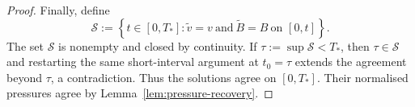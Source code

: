 \documentclass[11pt,reqno]{amsart}
\theoremstyle{plain}
\theoremstyle{definition}
\theoremstyle{remark}
\numberwithin{equation}{section}
\begin{document}
\begin{proof}
Finally, define
\[
 \mathcal S:=\left\{t\in[0,T_*]:
 \widetilde v=v\ \text{and}\ \widetilde B=B\ \text{on }[0,t]\right\}.
\]
The set $\mathcal S$ is nonempty and closed by continuity.  If
$\tau:=\sup\mathcal S<T_*$, then $\tau\in\mathcal S$ and restarting the
same short-interval argument at $t_0=\tau$ extends the agreement beyond
$\tau$, a contradiction.  Thus the solutions agree on $[0,T_*]$.  Their
normalised pressures agree by Lemma~\ref{lem:pressure-recovery}. 
\end{proof}




\end{document}
